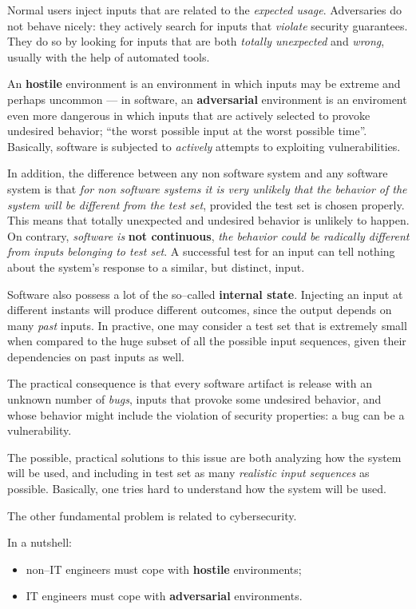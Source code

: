 \documentclass[10pt]{extreport}
\begin{document}
Normal users inject inputs that are related to the \emph{expected usage}.
Adversaries do not behave nicely: they actively search for inputs that
\emph{violate} security guarantees. They do so by looking for inputs that are
both \emph{totally unexpected} and \emph{wrong}, usually with the help of
automated tools.

An \textbf{hostile} environment is an environment in which inputs may be
extreme and perhaps uncommon --- in software, an \textbf{adversarial}
environment is an enviroment even more dangerous in which inputs that are
actively selected to provoke undesired behavior; ``the worst possible input at
the worst possible time''. Basically, software is subjected to \emph{actively}
attempts to exploiting vulnerabilities.

In addition, the difference between any non software system and any software
system is that \emph{for non software systems it is very unlikely that the
behavior of the system will be different from the test set}, provided the test
set is chosen properly. This means that totally unexpected and undesired
behavior is unlikely to happen. On contrary, \emph{software is }\textbf{not
continuous}, \emph{the behavior could be radically different from inputs
belonging to test set}. A successful test for an input can tell nothing about
the system's response to a similar, but distinct, input.

Software also possess a lot of the so--called \textbf{internal state}.
Injecting an input at different instants will produce different outcomes, since
the output depends on many \emph{past} inputs. In practive, one may consider a
test set that is extremely small when compared to the huge subset of all the
possible input sequences, given their dependencies on past inputs as well.

The practical consequence is that every software artifact is release with an
unknown number of \emph{bugs}, inputs that provoke some undesired behavior, and
whose behavior might include the violation of security properties: a bug can be
a vulnerability.

The possible, practical solutions to this issue are both analyzing how the
system will be used, and including in test set as many \emph{realistic input
sequences} as possible. Basically, one tries hard to understand how the system
will be used.

The other fundamental problem is related to cybersecurity.

In a nutshell:
\begin{itemize}
    \item non--IT engineers must cope with \textbf{hostile} environments;
    \item IT engineers must cope with \textbf{adversarial} environments.
\end{itemize}
\end{document}
